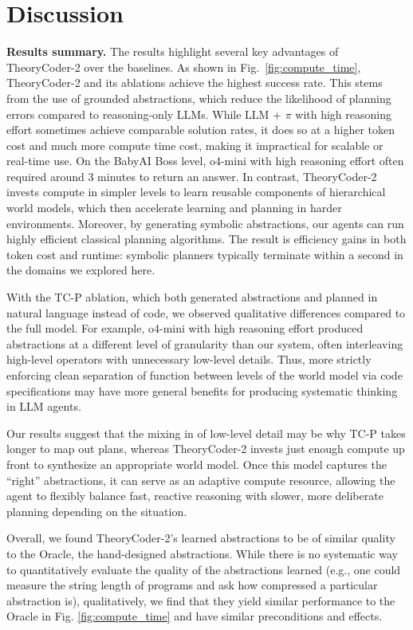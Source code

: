 \documentclass{article}
\theoremstyle{plain}
\theoremstyle{definition}
\theoremstyle{remark}
\begin{document}
\section{Discussion}
\label{sec:discussion}

\textbf{Results summary.} The results highlight several key advantages of TheoryCoder-2 over the baselines. As shown in Fig.~\ref{fig:compute_time}, TheoryCoder-2 and its ablations achieve the highest success rate. This stems from the use of grounded abstractions, which reduce the likelihood of planning errors compared to reasoning-only LLMs. While LLM + $\pi$ with high reasoning effort sometimes achieve comparable solution rates, it does so at a higher token cost and much more compute time cost, making it impractical for scalable or real-time use. On the BabyAI Boss level, o4-mini with high reasoning effort often required around 3 minutes to return an answer. In contrast, TheoryCoder-2 invests compute in simpler levels to learn reusable components of hierarchical world models, which then accelerate learning and planning in harder environments. Moreover, by generating symbolic abstractions, our agents can run highly efficient classical planning algorithms. The result is efficiency gains in both token cost and runtime: symbolic planners typically terminate within a second in the domains we explored here.

With the TC-P ablation, which both generated abstractions and planned in natural language instead of code, we observed qualitative differences compared to the full model. For example, o4-mini with high reasoning effort produced abstractions at a different level of granularity than our system, often interleaving high-level operators with unnecessary low-level details. Thus, more strictly enforcing clean separation of function between levels of the world model via code specifications may have more general benefits for producing systematic thinking in LLM agents.

Our results suggest that the mixing in of low-level detail may be why TC-P takes longer to map out plans, whereas TheoryCoder-2 invests just enough compute up front to synthesize an appropriate world model. Once this model captures the ``right'' abstractions, it can serve as an adaptive compute resource, allowing the agent to flexibly balance fast, reactive reasoning with slower, more deliberate planning depending on the situation.


Overall, we found TheoryCoder-2's learned abstractions to be of similar quality to the Oracle, the hand-designed abstractions. While there is no systematic way to quantitatively evaluate the quality of the abstractions learned (e.g., one could measure the string length of programs and ask how compressed a particular abstraction is), qualitatively, we find that they yield similar performance to the Oracle in Fig. \ref{fig:compute_time} and have similar preconditions and effects.
\end{document}

